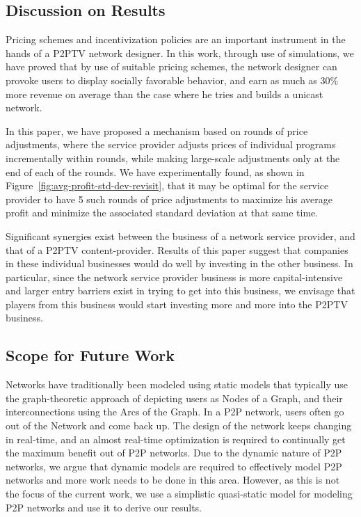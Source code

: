 \documentclass[conference,a4paper]{IEEEtran}
\begin{document}
\subsection{Discussion on Results}
\label{sec:discussion-results}
Pricing schemes and incentivization policies are an important instrument in the hands of a P2PTV network designer. In this work, through use of simulations, we have proved that by use of suitable pricing schemes, the network designer can provoke users to display socially favorable behavior, and earn as much as 30\% more revenue on average than the case where he tries and builds a unicast network. 



In this paper, we have proposed a mechanism based on rounds of price adjustments, where the service provider adjusts prices of individual programs incrementally within rounds, while making large-scale adjustments only at the end of each of the rounds. We have experimentally found, as shown in Figure~\ref{fig:avg-profit-std-dev-revisit}, that it may be optimal for the service provider to have 5 such rounds of price adjustments to maximize his average profit and minimize the associated standard deviation at that same time.

Significant synergies exist between the business of a network service provider, and that of a P2PTV content-provider. Results of this paper suggest that companies in these individual businesses would do well by investing in the other business. In particular, since the network service provider business is more capital-intensive and larger entry barriers exist in trying to get into this business, we envisage that players from this business would start investing more and more into the P2PTV business.

\subsection{Scope for Future Work}
\label{sec:scope-future-work}
Networks have traditionally been modeled using static models that typically use the graph-theoretic approach of depicting users as Nodes of a Graph, and their interconnections using the Arcs of the Graph. In a P2P network, users often go out of the Network and come back up. The design of the network keeps changing in real-time, and an almost real-time optimization is required to continually get the maximum benefit out of P2P networks. Due to the dynamic nature of P2P networks, we argue that dynamic models are required to effectively model P2P networks and more work needs to be done in this area. However, as this is not the focus of the current work, we use a simplistic quasi-static model for modeling P2P networks and use it to derive our results.
\end{document}
